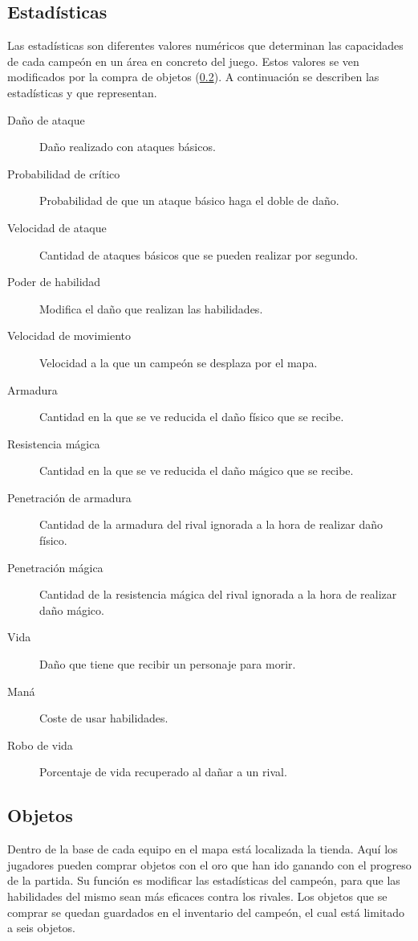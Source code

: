 \subsection{Estadísticas}
\label{estadisticas}
Las estadísticas son diferentes valores numéricos que determinan las capacidades de cada campeón en un área en concreto del juego. Estos valores se ven modificados por la compra de objetos (\ref{objetos}). A continuación se describen las estadísticas y que representan.
\begin{description}
	\item[Daño de ataque] Daño realizado con ataques básicos.
	\item[Probabilidad de crítico] Probabilidad de que un ataque básico haga el doble de daño.
	\item[Velocidad de ataque] Cantidad de ataques básicos que se pueden realizar por segundo.
	\item[Poder de habilidad] Modifica el daño que realizan las habilidades.
	\item[Velocidad de movimiento] Velocidad a la que un campeón se desplaza por el mapa.
	\item[Armadura] Cantidad en la que se ve reducida el daño físico que se recibe.
	\item[Resistencia mágica] Cantidad en la que se ve reducida el daño mágico que se recibe.
	\item[Penetración de armadura] Cantidad de la armadura del rival ignorada a la hora de realizar daño físico.
	\item[Penetración mágica] Cantidad de la resistencia mágica del rival ignorada a la hora de realizar daño mágico.
	\item[Vida] Daño que tiene que recibir un personaje para morir.
	\item[Maná] Coste de usar habilidades.
	\item[Robo de vida] Porcentaje de vida recuperado al dañar a un rival.
\end{description}

\subsection{Objetos}
\label{objetos}
Dentro de la base de cada equipo en el mapa está localizada la tienda. Aquí los jugadores pueden comprar objetos con el oro que han ido ganando con el progreso de la partida. Su función es modificar las estadísticas del campeón, para que las habilidades del mismo sean más eficaces contra los rivales. Los objetos que se comprar se quedan guardados en el inventario del campeón, el cual está limitado a seis objetos.

